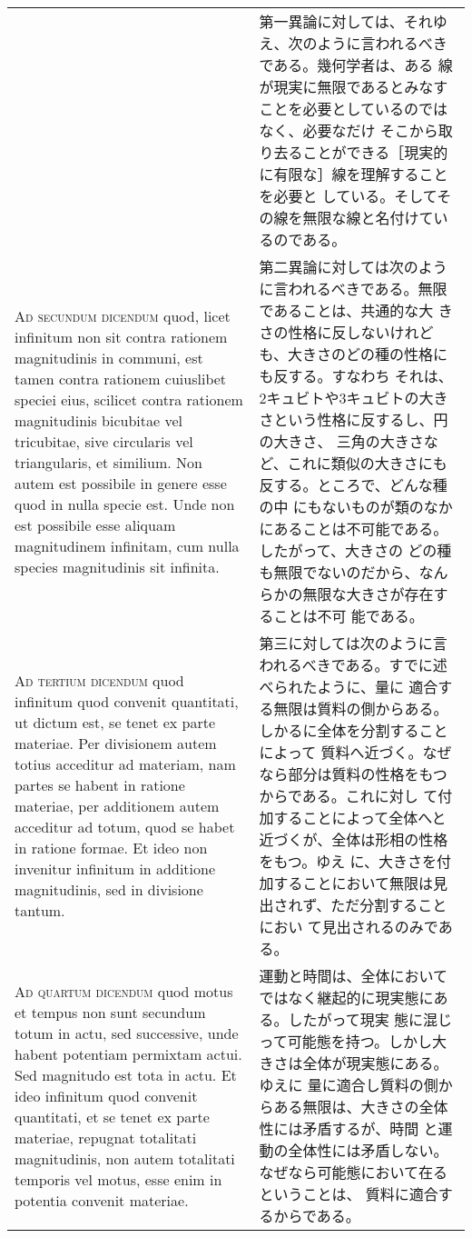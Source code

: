 \documentclass[10pt]{jsarticle} %
\begin{document}
\begin{longtable}{p{21em}p{21em}}
&

第一異論に対しては、それゆえ、次のように言われるべきである。幾何学者は、ある
 線が現実に無限であるとみなすことを必要としているのではなく、必要なだけ
 そこから取り去ることができる［現実的に有限な］線を理解することを必要と
 している。そしてその線を無限な線と名付けているのである。

\\


{\scshape Ad secundum dicendum} quod, licet infinitum non sit contra rationem
 magnitudinis in communi, est tamen contra rationem cuiuslibet speciei
 eius, scilicet contra rationem magnitudinis bicubitae vel tricubitae,
 sive circularis vel triangularis, et similium. Non autem est possibile
 in genere esse quod in nulla specie est. Unde non est possibile esse
 aliquam magnitudinem infinitam, cum nulla species magnitudinis sit
 infinita.

&

第二異論に対しては次のように言われるべきである。無限であることは、共通的な大
 きさの性格に反しないけれども、大きさのどの種の性格にも反する。すなわち
 それは、2キュビトや3キュビトの大きさという性格に反するし、円の大きさ、
 三角の大きさなど、これに類似の大きさにも反する。ところで、どんな種の中
 にもないものが類のなかにあることは不可能である。したがって、大きさの
 どの種も無限でないのだから、なんらかの無限な大きさが存在することは不可
 能である。


\\


{\scshape Ad tertium dicendum} quod infinitum quod convenit quantitati, ut dictum
 est, se tenet ex parte materiae. Per divisionem autem totius acceditur
 ad materiam, nam partes se habent in ratione materiae, per additionem
 autem acceditur ad totum, quod se habet in ratione formae. Et ideo non
 invenitur infinitum in additione magnitudinis, sed in divisione tantum.

&

第三に対しては次のように言われるべきである。すでに述べられたように、量に
 適合する無限は質料の側からある。しかるに全体を分割することによって
 質料へ近づく。なぜなら部分は質料の性格をもつからである。これに対し
 て付加することによって全体へと近づくが、全体は形相の性格をもつ。ゆえ
 に、大きさを付加することにおいて無限は見出されず、ただ分割することにおい
 て見出されるのみである。

\\


{\scshape Ad quartum dicendum} quod motus et tempus non sunt secundum totum in
 actu, sed successive, unde habent potentiam permixtam actui. Sed
 magnitudo est tota in actu. Et ideo infinitum quod convenit quantitati,
 et se tenet ex parte materiae, repugnat totalitati magnitudinis, non
 autem totalitati temporis vel motus, esse enim in potentia convenit
 materiae.

&

運動と時間は、全体においてではなく継起的に現実態にある。したがって現実
 態に混じって可能態を持つ。しかし大きさは全体が現実態にある。ゆえに
 量に適合し質料の側からある無限は、大きさの全体性には矛盾するが、時間
 と運動の全体性には矛盾しない。なぜなら可能態において在るということは、
 質料に適合するからである。


\end{longtable}
\end{document}
